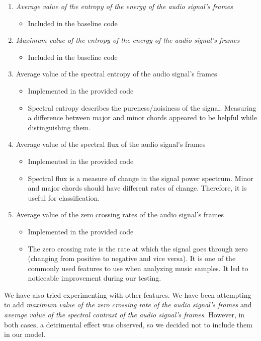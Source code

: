 \documentclass{article}
\begin{document}
\begin{enumerate}
\item \textit{Average value of the entropy of the energy of the audio signal’s frames}
\begin{itemize}
\item Included in the baseline code
\end{itemize}
\item \textit{Maximum value of the entropy of the energy of the audio signal’s frames}
\begin{itemize}
\item Included in the baseline code
\end{itemize}
\item Average value of the spectral entropy of the audio signal’s frames
\begin{itemize}
\item Implemented in the provided code
\item Spectral entropy describes the pureness/noisiness of the signal. Measuring a difference between major and minor chords appeared to be helpful while distinguishing them.
\end{itemize}
\item Average value of the spectral flux of the audio signal’s frames
\begin{itemize}
\item Implemented in the provided code
\item Spectral flux is a measure of change in the signal power spectrum. Minor and major chords should have different rates of change. Therefore, it is useful for classification.
\end{itemize}
\item Average value of the zero crossing rates of the audio signal’s frames
\begin{itemize}
\item Implemented in the provided code
\item The zero crossing rate is the rate at which the signal goes through zero (changing from positive to negative and vice versa). It is one of the commonly used features to use when analyzing music samples. It led to noticeable improvement during our testing.
\end{itemize}


\end{enumerate}

We have also tried experimenting with other features. We have been attempting to add \textit{maximum value of the zero crossing rate of the audio signal’s frames} and \textit{average value of the spectral contrast of the audio signal’s frames}. However, in both cases, a detrimental effect was observed, so we decided not to include them in our model.
\end{document}
